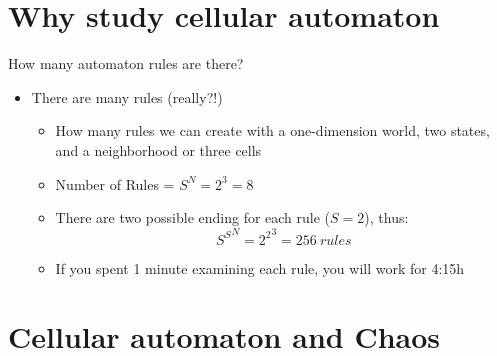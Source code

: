 \documentclass{beamer}
\begin{document}
\section{Why study cellular automaton}
\begin{frame}{How many automaton rules are there?}
\begin{itemize}
  \item There are many rules (really?!)
  \begin{itemize}
    \item How many rules we can create with a one-dimension world, two states, and a neighborhood or three cells
    \item Number of Rules = ${S}^{N} = {2}^{3} = 8$
    \item There are two possible ending for each rule ($S = 2$), thus:
      \begin{equation*}
       {S^S}^{N} = {2^2}^{3} = 256 ~rules
      \end{equation*}
    \item If you spent 1 minute examining each rule, you will work for 4:15h
  \end{itemize}
\end{itemize}
\end{frame}

\section{Cellular automaton and Chaos}
\end{document}
